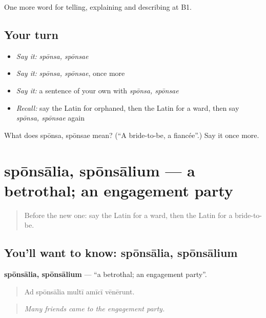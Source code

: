 \begin{grammarlens}[title={What you've built}]
One more word for telling, explaining and describing at B1.
\end{grammarlens}

\subsection*{Your turn}
\begin{itemize}
\raggedright
  \item \emph{Say it:} \emph{spōnsa, spōnsae}
  \item \emph{Say it:} \emph{spōnsa, spōnsae}, once more
  \item \emph{Say it:} a sentence of your own with \emph{spōnsa, spōnsae}
  \item \emph{Recall:} say the Latin for orphaned, then the Latin for a ward, then say \emph{spōnsa, spōnsae} again
\end{itemize}

\begin{tcolorbox}[breakable,colback=teal!4,colframe=teal!35!black,title={Before you move on}]
What does spōnsa, spōnsae mean? (\textquotedblleft{}A bride-to-be, a fiancée\textquotedblright{}.) Say it once more.
\end{tcolorbox}
\section[spōnsālia, spōnsālium]{spōnsālia, spōnsālium — a betrothal; an engagement party}

\label{lesson:LA-C327-sponsalia}



\begin{quote}
Before the new one: say the Latin for a ward, then the Latin for a bride-to-be.
\end{quote}

\subsection*{You'll want to know: spōnsālia, spōnsālium}
\textbf{spōnsālia, spōnsālium} — \textquotedblleft{}a betrothal; an engagement party\textquotedblright{}.

\begin{quote}
Ad spōnsālia multī amīcī vēnērunt.
\end{quote}

\begin{quote}
\emph{Many friends came to the engagement party.}
\end{quote}

